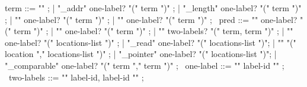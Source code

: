 \begin{syntax}
  term ::= "\null" ;
        | "\base_addr" one-label? "(" term ")" ;
        | "\block_length" one-label? "(" term ")" ;
        | "\offset" one-label?  "(" term ")" ;
        | {"\allocation"} one-label? "(" term ")" ;
       \
  pred ::=  "\allocable" one-label? "(" term ")" ;
       |  "\freeable" one-label? "(" term ")" ;
       | "\fresh"   two-labels? "(" term, term ")" ;
       | "\valid"  one-label?  "(" locations-list ")" ;
       | "\valid_read"  one-label? "(" locations-list ")";
       | "\separated" "(" location "," locations-list ")" ;
       | "\object_pointer" one-label? "(" locations-list ")";
       | "\pointer_comparable" one-label? "(" term "," term ")" ;
       \
  one-label ::= "{" label-id "}" ;
       \
  two-labels ::= "{" label-id, label-id "}" ;
\end{syntax}

